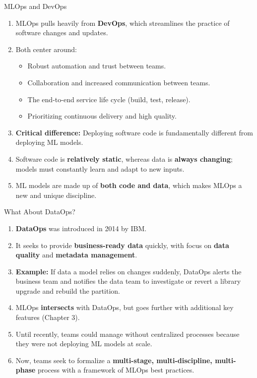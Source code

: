 \begin{frame}{MLOps and DevOps}
\begin{enumerate}
\item<1-> MLOps pulls heavily from \textbf{DevOps}, which streamlines the practice of software changes and updates.
\item<2-> Both center around:
    \begin{itemize}
    \item Robust automation and trust between teams.
    \item Collaboration and increased communication between teams.
    \item The end-to-end service life cycle (build, test, release).
    \item Prioritizing continuous delivery and high quality.
    \end{itemize}
\item<3-> \textbf{Critical difference:} Deploying software code is fundamentally different from deploying ML models.
\item<4-> Software code is \textbf{relatively static}, whereas data is \textbf{always changing}; models must constantly learn and adapt to new inputs.
\item<5-> ML models are made up of \textbf{both code and data}, which makes MLOps a new and unique discipline.
\end{enumerate}
\end{frame}

\begin{frame}{What About DataOps?}
\begin{enumerate}
\item<1-> \textbf{DataOps} was introduced in 2014 by IBM.
\item<2-> It seeks to provide \textbf{business-ready data} quickly, with focus on \textbf{data quality} and \textbf{metadata management}.
\item<3-> \textbf{Example:} If data a model relies on changes suddenly, DataOps alerts the business team and notifies the data team to investigate or revert a library upgrade and rebuild the partition.
\item<4-> MLOps \textbf{intersects} with DataOps, but goes further with additional key features (Chapter 3).
\item<5-> Until recently, teams could manage without centralized processes because they were not deploying ML models at scale.
\item<6-> Now, teams seek to formalize a \textbf{multi-stage, multi-discipline, multi-phase} process with a framework of MLOps best practices.
\end{enumerate}
\end{frame}

